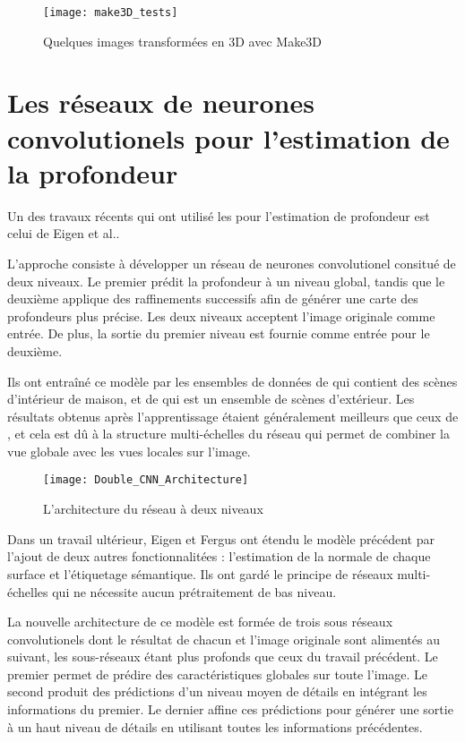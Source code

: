 \begin{figure}[H]
\texttt{[image: make3D\_tests]}
\caption{Quelques images transformées en 3D avec Make3D}
\end{figure}

\section{Les réseaux de neurones convolutionels pour l'estimation de la profondeur}

Un des travaux récents qui ont utilisé les 
pour l'estimation de profondeur est celui de Eigen et al.\cite{eigen2014depth}.

L'approche consiste à développer un réseau de neurones convolutionel consitué de
deux niveaux. Le premier prédit la profondeur à un niveau global, tandis que le
deuxième applique des raffinements successifs afin de générer une carte des
profondeurs plus précise. Les deux niveaux acceptent l'image originale comme
entrée. De plus, la sortie du premier niveau est fournie comme entrée pour
le deuxième.

Ils ont entraîné ce modèle par les ensembles de données de  qui
contient des scènes d'intérieur de maison, et de  qui est un ensemble
de scènes d'extérieur. Les résultats obtenus après l'apprentissage étaient
généralement meilleurs que ceux de , et cela est dû à la
structure multi-échelles du réseau qui permet de combiner la vue globale avec les
vues locales sur l'image.

\begin{figure}[H]
\begin{center}
\texttt{[image: Double\_CNN\_Architecture]}
\caption{L'architecture du réseau à deux niveaux}
\end{center}
\end{figure}

\vspace{-1em}

Dans un travail ultérieur, Eigen et Fergus\cite{eigen2015predicting} ont étendu
le modèle précédent par l'ajout de deux autres fonctionnalitées : l'estimation
de la normale de chaque surface et l'étiquetage sémantique. Ils ont gardé le
principe de réseaux multi-échelles qui ne nécessite aucun prétraitement de bas
niveau.

La nouvelle architecture de ce modèle est formée de trois sous réseaux
convolutionels dont le résultat de chacun et l'image originale sont alimentés
au suivant, les sous-réseaux étant plus profonds que ceux du travail précédent.
Le premier permet de prédire des caractéristiques globales sur toute l'image.
Le second produit des prédictions d'un niveau moyen de détails en intégrant les
informations du premier. Le dernier affine ces prédictions pour générer une
sortie à un haut niveau de détails en utilisant toutes les informations précédentes.

